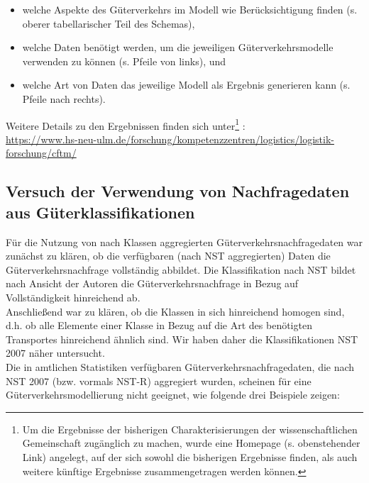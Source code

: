\begin{itemize}
%
   \item welche Aspekte des Güterverkehrs im Modell wie Berücksichtigung finden (s. oberer tabellarischer Teil des Schemas),
   \item welche Daten benötigt werden, um die jeweiligen Güterverkehrsmodelle verwenden zu können (s. Pfeile von links), und
   \item welche Art von Daten das jeweilige Modell als Ergebnis generieren kann (s. Pfeile nach rechts).
%
\end{itemize}
Weitere Details zu den Ergebnissen finden sich unter\footnote{%
 Um die Ergebnisse der bisherigen Charakterisierungen der wissenschaftlichen Gemeinschaft zugänglich zu machen, wurde eine Homepage (s. obenstehender Link) angelegt, auf der sich sowohl die bisherigen Ergebnisse finden, als auch weitere künftige Ergebnisse zusammengetragen werden können.
}%
:~\\
\href{https://www.hs-neu-ulm.de/forschung/kompetenzzentren/logistics/logistik-forschung/cftm/}{https://www.hs-neu-ulm.de/forschung/kompetenzzentren/logistics/logistik-forschung/cftm/}~\\


% 
\subsection{Versuch der Verwendung von Nachfragedaten aus Güterklassifikationen}
\label{_Toc366766107}
\label{_Toc366775301}
\label{_Ref364934068}
\label{_Toc364945133}
\label{_Toc365801605}
Für die Nutzung von nach Klassen aggregierten Güterverkehrsnachfragedaten war zunächst zu klären, ob die verfügbaren (nach NST aggregierten) Daten die Güterverkehrsnachfrage vollständig abbildet. Die Klassifikation nach NST bildet nach Ansicht der Autoren die Güterverkehrsnachfrage in Bezug auf Vollständigkeit hinreichend ab.~\\
Anschließend war zu klären, ob die Klassen in sich hinreichend homogen sind, d.h. ob alle Elemente einer Klasse in Bezug auf die Art des benötigten Transportes hinreichend ähnlich sind. Wir haben daher die Klassifikationen NST 2007 näher untersucht.~\\
Die in amtlichen Statistiken verfügbaren Güterverkehrsnachfragedaten, die nach NST 2007 (bzw. vormals NST-R) aggregiert wurden, scheinen für eine Güterverkehrsmodellierung nicht geeignet, wie folgende drei Beispiele zeigen:~\\

